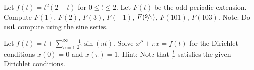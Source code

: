 \documentclass{ximera}
\begin{document}
\begin{exercise}
    Let $f(t) = t^2(2-t)$ for $0 \leq t \leq 2$.  Let $F(t)$ be the odd periodic extension.  Compute $F(1)$, $F(2)$, $F(3)$, $F(-1)$, $F(\nicefrac{9}{2})$, $F(101)$, $F(103)$.  Note: Do \textbf{not} compute using the sine series.
\end{exercise}

\begin{exercise}%
    Let $f(t) = t + \sum_{n=1}^\infty \frac{1}{2^n} \sin(nt)$.  Solve $x'' + \pi x = f(t)$ for the Dirichlet conditions $x(0) = 0$ and $x(\pi) = 1$.  Hint:  Note that $\frac{t}{\pi}$ satisfies the given Dirichlet conditions.
\end{exercise}

\end{document}
